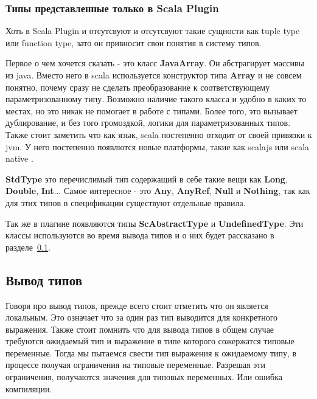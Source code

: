 \subsubsection{Типы представленные только в Scala Plugin}
Хоть в Scala Plugin и отсутсвуют и отсутсвуют такие сущности как tuple type или
function type, зато он привносит свои понятия в систему типов.

Первое о чем хочется сказать - это класс \textbf{JavaArray}.
Он абстрагирует массивы из java.
Вместо него в scala используется конструктор типа \textbf{Array} и не совсем
понятно, почему сразу не сделать преобразование к соответствующему
параметризованному типу.
Возможно наличие такого класса и удобно в каких то местах, но это никак не
помогает в работе с типами.
Более того, это вызывает дублирование, и без того громоздкой, логики для
параметризованных типов.
Также стоит заметить что как язык, scala постепенно отходит от своей привязки к jvm.
У него постепенно появлются новые платформы, такие как scalajs \cite{scalajs}
или scala native \cite{scala_native}.

\textbf{StdType} это перечислимый тип содержащий в себе такие вещи как
\textbf{Long}, \textbf{Double}, \textbf{Int}...
Самое интересное - это \textbf{Any}, \textbf{AnyRef}, \textbf{Null} и
\textbf{Nothing}, так как для этих типов в спецификации существуют отдельные
правила.

Так же в плагине появляются типы \textbf{ScAbstractType} и \textbf{UndefinedType}.
Эти классы используются во время вывода типов и о них будет рассказано в
разделе~\ref{sec:infer}.

\subsection{Вывод типов}
\label{sec:infer}

Говоря про вывод типов, прежде всего стоит отметить что он является локальным.
Это означает что за один раз тип выводится для конкретного выражения.
Также стоит помнить что для вывода типов в общем случае требуются ожидаемый тип
и выражение в типе которого сожержатся типовые переменные.
Тогда мы пытаемся свести тип выражения к ожидаемому типу, в процессе получая
ограничения на типовые переменные.
Разрешая эти ограничения, получаются значения для типовых переменных.
Или ошибка компиляции.

